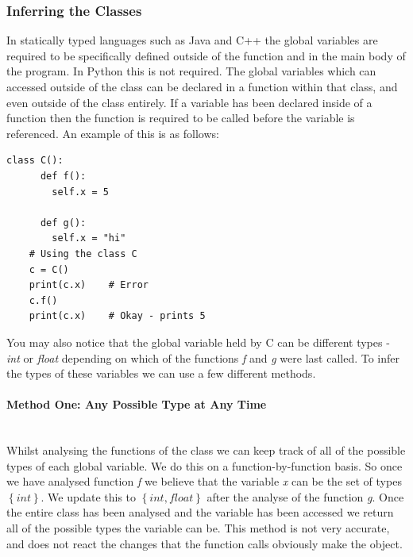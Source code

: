 \documentclass[12pt, titlepage]{article}
\begin{document}
\subsubsection{Inferring the Classes}
In statically typed languages such as Java and C++ the global variables are required to be specifically defined outside of the function and in the main body of the program. In Python this is not required. The global variables which can accessed outside of the class can be declared in a function within that class, and even outside of the class entirely. If a variable has been declared inside of a function then the function is required to be called before the variable is referenced. An example of this is as follows:
\begin{lstlisting}[mathescape]
	class C():
	  def f():
	    self.x = 5
		
	  def g():
	    self.x = "hi"
	# Using the class C
	c = C()
	print(c.x)    # Error
	c.f()
	print(c.x)    # Okay - prints 5
\end{lstlisting}
You may also notice that the global variable held by C can be different types - \textit{int} or \textit{float} depending on which of the functions \textit{f} and \textit{g} were last called. To infer the types of these variables we can use a few different methods.

\paragraph{Method One: Any Possible Type at Any Time}\mbox{}\\
Whilst analysing the functions of the class we can keep track of all of the possible types of each global variable. We do this on a function-by-function basis. So once we have analysed function \textit{f} we believe that the variable \textit{x} can be the set of types $\left\{ {int}\right\}$. We update this to $\left\{ {int, float}\right\}$ after the analyse of the function \textit{g}. Once the entire class has been analysed and the variable has been accessed we return all of the possible types the variable can be. This method is not very accurate, and does not react the changes that the function calls obviously make the object.
\end{document}

